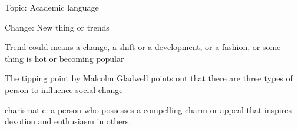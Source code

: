 Topic: Academic language

\begin{notation}
    Change: New thing or trends
\end{notation}
Trend could means a change, a shift or a development, or a fashion, or some thing is hot or becoming popular
\begin{notation}
    The tipping point by Malcolm Gladwell points out that there are three types of person to influence social change
\end{notation}
\begin{defi}
    charismatic: a person who possesses a compelling charm or appeal that inspires devotion and enthusiasm in others.
\end{defi}

